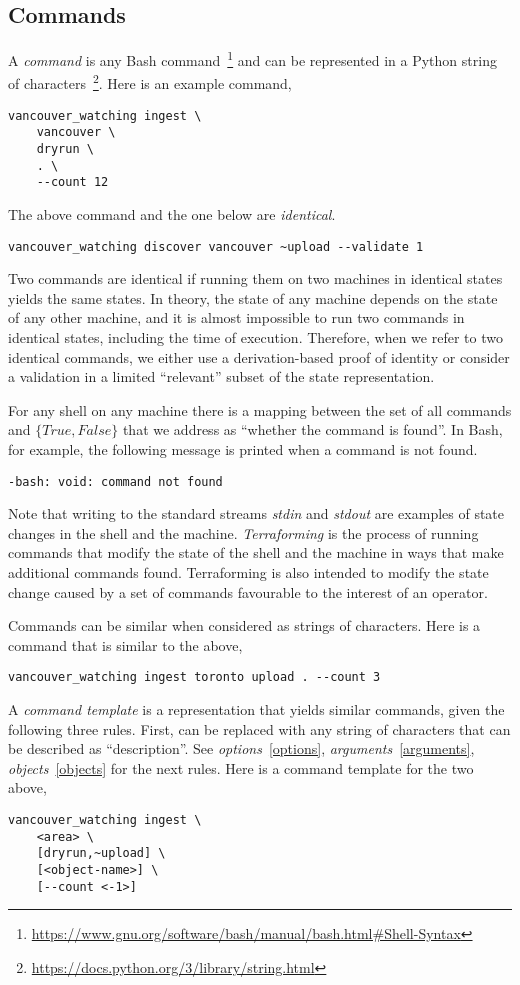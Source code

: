 \subsection{Commands}
\label{commands}

A \emph{command} is any Bash command~\footnote{\url{https://www.gnu.org/software/bash/manual/bash.html\#Shell-Syntax}} and can be represented in a Python string of characters~\footnote{\url{https://docs.python.org/3/library/string.html}}. Here is an example command,
%
\begin{verbatim}
vancouver_watching ingest \
    vancouver \
    dryrun \
    . \
    --count 12
\end{verbatim}
%
The above command and the one below are \emph{identical}.
%
\begin{verbatim}
vancouver_watching discover vancouver ~upload --validate 1
\end{verbatim}
%
Two commands are identical if running them on two machines in identical states yields the same states. In theory, the state of any machine depends on the state of any other machine, and it is almost impossible to run two commands in identical states, including the time of execution. Therefore, when we refer to two identical commands, we either use a derivation-based proof of identity or consider a validation in a limited ``relevant'' subset of the state representation.

For any shell on any machine there is a mapping between the set of all commands and $\{True,False\}$ that we address as ``whether the command is found''. In Bash, for example, the following message is printed when a command is not found.
%
\begin{verbatim}
-bash: void: command not found
\end{verbatim}
%
Note that writing to the standard streams \emph{stdin} and \emph{stdout} are examples of state changes in the shell and the machine. \emph{Terraforming} is the process of running commands that modify the state of the shell and the machine in ways that make additional commands found. Terraforming is also intended to modify the state change caused by a set of commands favourable to the interest of an operator.

Commands can be similar when considered as strings of characters. Here is a command that is similar to the above,
%
\begin{verbatim}
vancouver_watching ingest toronto upload . --count 3
\end{verbatim}

A \emph{command template} is a representation that yields similar commands, given the following three rules. First,  can be replaced with any string of characters that can be described as ``description''. See \emph{options}~\ref{options}, \emph{arguments}~\ref{arguments}, \emph{objects}~\ref{objects} for the next rules. Here is a command template for the two above,
%
\begin{verbatim}
vancouver_watching ingest \
    <area> \
    [dryrun,~upload] \
    [<object-name>] \
    [--count <-1>]
\end{verbatim}